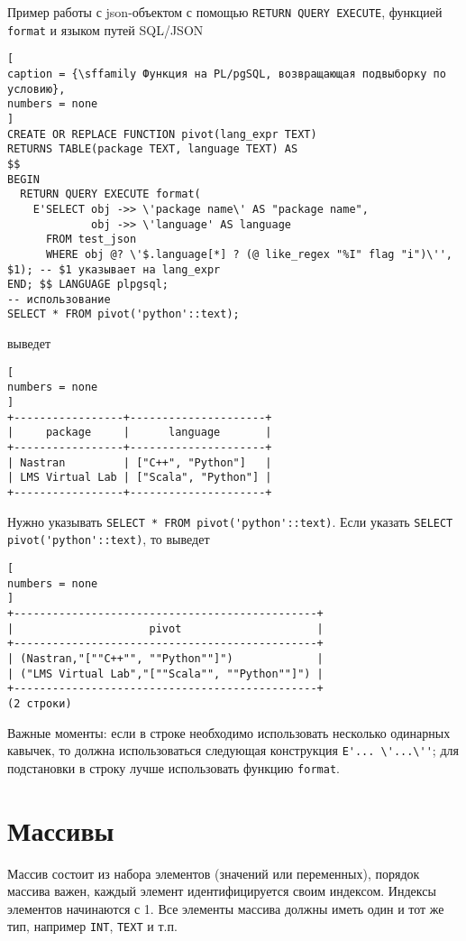 \documentclass[%
	11pt,
	a4paper,
	utf8,
		]{article}
\begin{document}
Пример работы с json-объектом с помощью \texttt{\color{blue}RETURN QUERY EXECUTE}, функцией \texttt{format} и языком путей SQL/JSON
\begin{lstlisting}[
caption = {\sffamily Функция на PL/pgSQL, возвращающая подвыборку по условию},
numbers = none
]
CREATE OR REPLACE FUNCTION pivot(lang_expr TEXT)
RETURNS TABLE(package TEXT, language TEXT) AS
$$
BEGIN
  RETURN QUERY EXECUTE format(
    E'SELECT obj ->> \'package name\' AS "package name",
             obj ->> \'language' AS language
      FROM test_json
      WHERE obj @? \'$.language[*] ? (@ like_regex "%I" flag "i")\'', $1); -- $1 указывает на lang_expr
END; $$ LANGUAGE plpgsql;
-- использование
SELECT * FROM pivot('python'::text);
\end{lstlisting}
выведет
\begin{lstlisting}[
numbers = none
]
+-----------------+---------------------+
|     package     |      language       |
+-----------------+---------------------+
| Nastran         | ["C++", "Python"]   |
| LMS Virtual Lab | ["Scala", "Python"] |
+-----------------+---------------------+
\end{lstlisting}
Нужно указывать \lstinline{SELECT * FROM pivot('python'::text)}. Если указать \lstinline{SELECT pivot('python'::text)}, то выведет
\begin{lstlisting}[
numbers = none
]
+-----------------------------------------------+
|                     pivot                     |
+-----------------------------------------------+
| (Nastran,"[""C++"", ""Python""]")             |
| ("LMS Virtual Lab","[""Scala"", ""Python""]") |
+-----------------------------------------------+
(2 строки)
\end{lstlisting}

Важные моменты: если в строке необходимо использовать несколько одинарных кавычек, то должна использоваться следующая конструкция {\color{blue}\lstinline{E'... \'...\''}}; для подстановки в строку лучше использовать функцию \texttt{format}.

\section{Массивы}

Массив состоит из набора элементов (значений или переменных), порядок массива важен, каждый элемент идентифицируется своим индексом. Индексы элементов начинаются с 1. Все элементы массива должны иметь один и тот же тип, например \texttt{INT}, \texttt{TEXT} и т.п.
\end{document}
